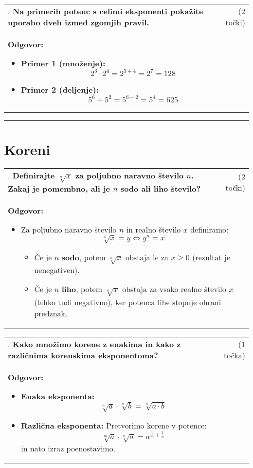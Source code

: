 \documentclass[12pt]{article}
\newcounter{vprasanje}[section]
\renewcommand{\thevprasanje}{\roman{vprasanje}}
\newcommand{\vprasanje}[2]{%
  \stepcounter{vprasanje}%
  \textbf{\thevprasanje}. \textbf{#1} & (#2) \\
}
\newcommand{\odgovor}[1]{%
  \multicolumn{2}{p{\dimexpr\textwidth-2\tabcolsep\relax}}{%
    \small \textbf{Odgovor:} #1%
  } \\[1em]%
}
\newcommand{\crta}{\rule{\textwidth}{0.4pt}}
\newcommand{\naslov}[1]{%
  \vspace{1em} 
  \section{#1}
  \addcontentsline{toc}{section}{\protect\numberline{}#1}%
}
\newcommand{\razmak}[1]{%
  \vspace{#1}
}
\begin{document}
\begin{tabularx}{\textwidth}{X r}
\vprasanje{Na primerih potenc s celimi eksponenti pokažite uporabo dveh izmed zgomjih pravil.}{2 točki}
\odgovor{%
\begin{itemize}
	\item \textbf{Primer 1 (množenje):}
	\[
	2^3 \cdot 2^4 = 2^{3+4} = 2^7 = 128
	\]

	\item \textbf{Primer 2 (deljenje):}
	\[
	5^6 \div 5^2 = 5^{6-2} = 5^4 = 625
	\]
\end{itemize}
}
\end{tabularx}
\razmak{0.5em}


\crta

\naslov{Koreni}

\begin{tabularx}{\textwidth}{X r}
\vprasanje{Definirajte $\sqrt[n]{x}$ za poljubno naravno število $n$. Zakaj je pomembno, ali je $n$ sodo ali liho število?}{2 točki}
\odgovor{%
\begin{itemize}
	\item Za poljubno naravno število $n$ in realno število $x$ definiramo:
\[
\sqrt[n]{x} = y \iff y^n = x
\]

	\begin{itemize}
		\item Če je $n$ \textbf{sodo}, potem $\sqrt[n]{x}$ obstaja le za $x \ge 0$ (rezultat je nenegativen).
		\item Če je $n$ \textbf{liho}, potem $\sqrt[n]{x}$ obstaja za vsako realno število $x$ (lahko tudi negativno), ker potenca lihe stopnje ohrani predznak. %
	\end{itemize}
\end{itemize}
}
\end{tabularx}

\begin{tabularx}{\textwidth}{X r}
\vprasanje{Kako množimo korene z enakima in kako z različnima korenskima eksponentoma?}{1 točka}
\odgovor{%
\begin{itemize}
	\item \textbf{Enaka eksponenta:}
	\[
	\sqrt[n]{a} \cdot \sqrt[n]{b} = \sqrt[n]{a \cdot b}
	\]

	\item \textbf{Različna eksponenta:} Pretvorimo korene v potence:
	\[
	\sqrt[m]{a} \cdot \sqrt[n]{a} = a^{\frac{1}{m} + \frac{1}{n}}
	\]
	in nato izraz poenostavimo.
\end{itemize}
}
\end{tabularx}
\end{document}
